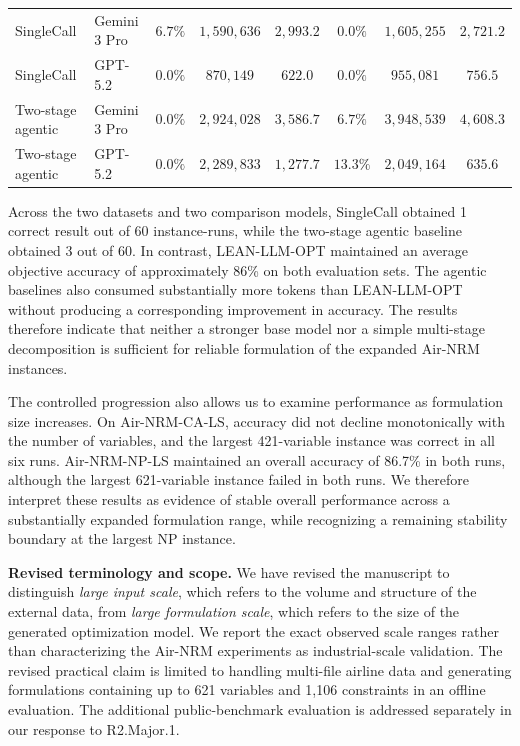 \documentclass[11pt]{article}
\begin{document}
\begin{enumerate}[label=(R2.Major.\arabic*),leftmargin=*]
\begin{table}[!htbp]
{\begin{tabular}{llccc|ccc}
SingleCall & Gemini 3 Pro
& $6.7\%$ & $1{,}590{,}636$ & $2{,}993.2$
& $0.0\%$ & $1{,}605{,}255$ & $2{,}721.2$ \\

SingleCall & GPT-5.2
& $0.0\%$ & $870{,}149$ & $622.0$
& $0.0\%$ & $955{,}081$ & $756.5$ \\

Two-stage agentic & Gemini 3 Pro
& $0.0\%$ & $2{,}924{,}028$ & $3{,}586.7$
& $6.7\%$ & $3{,}948{,}539$ & $4{,}608.3$ \\

Two-stage agentic & GPT-5.2
& $0.0\%$ & $2{,}289{,}833$ & $1{,}277.7$
& $13.3\%$ & $2{,}049{,}164$ & $635.6$ \\
\bottomrule
\end{tabular}
}
\end{table}

Across the two datasets and two comparison models, SingleCall obtained
1 correct result out of 60 instance-runs, while the two-stage agentic
baseline obtained 3 out of 60. In contrast, LEAN-LLM-OPT maintained an
average objective accuracy of approximately 86\% on both evaluation sets.
The agentic baselines also consumed substantially more tokens than
LEAN-LLM-OPT without producing a corresponding improvement in accuracy.
The results therefore indicate that neither a stronger base model nor a
simple multi-stage decomposition is sufficient for reliable formulation of
the expanded Air-NRM instances.

The controlled progression also allows us to examine performance as
formulation size increases. On Air-NRM-CA-LS, accuracy did not decline
monotonically with the number of variables, and the largest 421-variable
instance was correct in all six runs. Air-NRM-NP-LS maintained an overall
accuracy of 86.7\% in both runs, although the largest 621-variable instance
failed in both runs. We therefore interpret these results as evidence of
stable overall performance across a substantially expanded formulation
range, while recognizing a remaining stability boundary at the largest NP
instance.

\medskip
\noindent\textbf{Revised terminology and scope.}
We have revised the manuscript to distinguish \emph{large input scale},
which refers to the volume and structure of the external data, from
\emph{large formulation scale}, which refers to the size of the generated
optimization model. We report the exact observed scale ranges rather than
characterizing the Air-NRM experiments as industrial-scale validation. The
revised practical claim is limited to handling multi-file airline data and
generating formulations containing up to 621 variables and 1,106 constraints
in an offline evaluation. The additional public-benchmark evaluation is
addressed separately in our response to R2.Major.1.


\end{enumerate}
\end{document}
